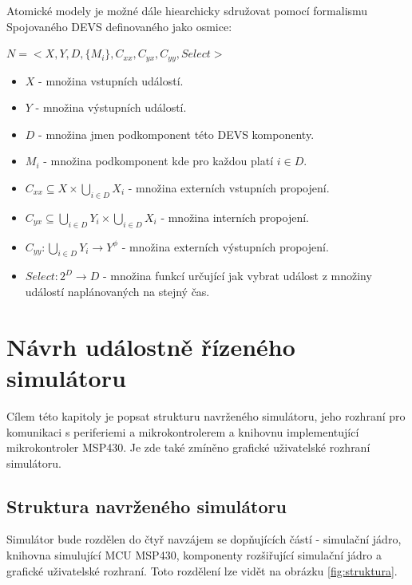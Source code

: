 Atomické modely je možné dále hiearchicky sdružovat pomocí formalismu Spojovaného DEVS definovaného jako osmice:

\begin{math}
N=<X,Y,D,\{M_i\},C_{xx}, C_{yx}, C_{yy}, Select>
\end{math}

\begin{itemize}
\item $X$ - množina vstupních událostí.
\item $Y$ - množina výstupních událostí.
\item $D$ - množina jmen podkomponent této DEVS komponenty.
\item $M_i$ - množina podkomponent kde pro každou platí $i \in D$.
\item $C_{xx}\subseteq X \times \bigcup_{i \in D} X_i$ - množina externích vstupních propojení.
\item $C_{yx}\subseteq \bigcup_{i \in D} Y_i \times \bigcup_{i \in D} X_i$ - množina interních propojení.
\item $C_{yy}: \bigcup_{i \in D} Y_i \rightarrow Y^\phi$ - množina externích výstupních propojení.
\item $Select:2^D \rightarrow D$ - množina funkcí určující jak vybrat událost z množiny událostí naplánovaných na stejný čas.
\end{itemize}

\chapter{Návrh událostně řízeného simulátoru}
\label{navrh}

Cílem této kapitoly je popsat strukturu navrženého simulátoru, jeho rozhraní pro komunikaci s periferiemi a mikrokontrolerem a knihovnu implementující mikrokontroler MSP430. Je zde také zmíněno grafické uživatelské rozhraní simulátoru.

\section{Struktura navrženého simulátoru}

Simulátor bude rozdělen do čtyř navzájem se dopňujících částí - simulační jádro, knihovna simulující MCU MSP430, komponenty rozšiřující simulační jádro a grafické uživatelské rozhraní. Toto rozdělení lze vidět na obrázku \ref{fig:struktura}.

